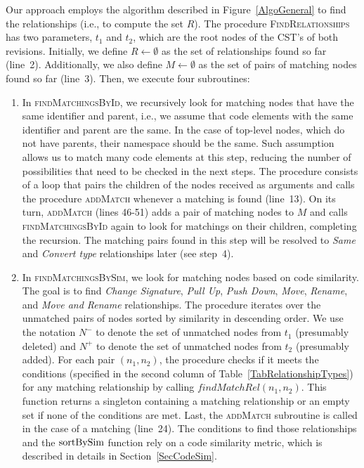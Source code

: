 





Our approach employs the algorithm described in Figure~\ref{AlgoGeneral} to find the relationships (i.e., to compute the set $R$).
The procedure \textsc{FindRelationships} has two parameters, $t_1$ and $t_2$, which are the root nodes of the CST's of both revisions.
Initially, we define $R \gets \emptyset$ as the set of relationships found so far (line~2).
Additionally, we also define $M \gets \emptyset$ as the set of pairs of matching nodes found so far (line~3).
Then, we execute four subroutines:
\begin{enumerate}

\item In \textsc{findMatchingsById}, we recursively look for matching nodes that have the same identifier and parent, i.e., we assume that code elements with the same identifier and parent are the same. In the case of top-level nodes, which do not have parents, their namespace should be the same.
Such assumption allows us to match many code elements at this step, reducing the number of possibilities that need to be checked in the next steps.
The procedure consists of a loop that pairs the children of the nodes received as arguments and calls the procedure \textsc{addMatch} whenever a matching is found (line~13).
On its turn, \textsc{addMatch} (lines 46-51) adds a pair of matching nodes to $M$ and calls \textsc{findMatchingsById} again to look for matchings on their children, completing the recursion.
The matching pairs found in this step will be resolved to \textit{Same} and \textit{Convert type} relationships later (see step~4).

\item In \textsc{findMatchingsBySim}, we look for matching nodes based on code similarity.
The goal is to find \textit{Change Signature}, \textit{Pull Up}, \textit{Push Down}, \textit{Move}, \textit{Rename}, and \textit{Move and Rename} relationships.
The procedure iterates over the unmatched pairs of nodes sorted by similarity in descending order.
We use the notation $N^-$ to denote the set of unmatched nodes from $t_1$ (presumably deleted) and $N^+$ to denote the set of unmatched nodes from $t_2$ (presumably added).
For each pair $(n_1, n_2)$, the procedure checks if it meets the conditions (specified in the second column of Table~\ref{TabRelationshipTypes}) for any matching relationship by calling $\mathit{findMatchRel}(n_1, n_2)$.
This function returns a singleton containing a matching relationship or an empty set if none of the conditions are met.
Last, the \textsc{addMatch} subroutine is called in the case of a matching (line~24).
The conditions to find those relationships and the $\operatorname{sortBySim}$ function rely on a code similarity metric, which is described in details in Section~\ref{SecCodeSim}.


\end{enumerate}

